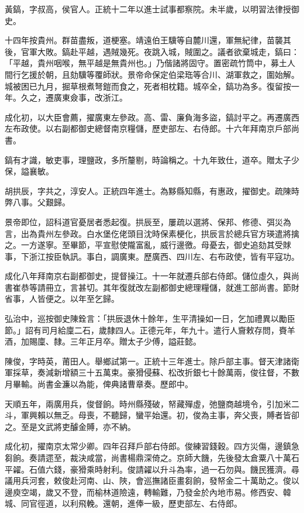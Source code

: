 \begin{pinyinscope}
黃鎬，字叔高，侯官人。正統十二年以進士試事都察院。未半歲，以明習法律授御史。

十四年按貴州。群苗盡叛，道梗塞。靖遠伯王驥等自麓川還，軍無紀律，苗襲其後，官軍大敗。鎬赴平越，遇賊幾死。夜跳入城，賊圍之。議者欲棄城走，鎬曰：「平越，貴州咽喉，無平越是無貴州也。」乃偕諸將固守。置密疏竹筒中，募土人間行乞援於朝，且劾驥等覆師狀。景帝命保定伯梁珤等合川、湖軍救之，圍始解。城被困已九月，掘草根煮弩鎧而食之，死者相枕籍。城卒全，鎬功為多。復留按一年。久之，遷廣東僉事，改浙江。

成化初，以大臣會薦，擢廣東左參政。高、雷、廉負海多盜，鎬討平之。再遷廣西左布政使。以右副都御史總督南京糧儲，歷吏部左、右侍郎。十六年拜南京戶部尚書。

鎬有才識，敏吏事，理鹽政，多所釐剔，時論稱之。十九年致仕，道卒。贈太子少保，謚襄敏。

胡拱辰，字共之，淳安人。正統四年進士。為黟縣知縣，有惠政，擢御史。疏陳時弊八事。父艱歸。

景帝即位，詔科道官憂居者悉起復。拱辰至，屢疏以選將、保邦、修德、弭災為言，出為貴州左參政。白水堡仡佬頭目沈時保素梗化，拱辰言於總兵官方瑛遣將擒之。一方遂寧。至畢節，平宣慰使隴富亂，威行邊徼。母憂去，御史追劾其受賕事，下浙江按臣執訊。事白，調廣東。歷廣西、四川左、右布政使，皆有平寇功。

成化八年拜南京右副都御史，提督操江。十一年就遷兵部右侍郎。儲位虛久，與尚書崔恭等請冊立，言甚切。其年復就改左副都御史總理糧儲，就進工部尚書。節財省事，人皆便之。以年至乞歸。

弘治中，巡按御史陳銓言：「拱辰退休十餘年，生平清操如一日，乞加禮異以勵臣節。」詔有司月給廩二石，歲隸四人。正德元年，年九十。遣行人齎敕存問，賚羊酒，加賜廩、隸。三年正月卒。贈太子少傅，謚莊懿。

陳俊，字時英，莆田人。舉鄉試第一。正統十三年進士。除戶部主事。督天津諸衛軍採草，奏減新增額三十五萬束。豪猾侵蘇、松改折銀七十餘萬兩，俊往督，不數月畢輸。尚書金濂以為能，俾典諸曹章奏。歷郎中。

天順五年，兩廣用兵，俊督餉。時州縣殘破，帑藏殫虛，弛鹽商越境令，引加米二斗，軍興賴以無乏。母喪，不聽歸，蠻平始還。初，俊為主事，奔父喪，賻者皆卻之。至是文武將吏醵金賻，亦不納。

成化初，擢南京太常少卿。四年召拜戶部右侍郎。俊練習錢穀。四方災傷，邊鎮急芻餉。奏請遝至，裁決咸當，尚書楊鼎深倚之。京師大饑，先後發太倉粟八十萬石平糴。石值六錢，豪猾乘時射利。俊請糴以升斗為率，過一石勿與。饑民獲濟。尋議用兵河套，敕俊赴河南、山、陜，會巡撫諸臣畫芻餉，發帑金二十萬助之。俊以邊庾空竭，歲又不登，而榆林道險遠，轉輸難，乃發金於內地市易。修西安、韓城、同官徑道，以利飛輓。還朝，進俸一級，歷吏部左、右侍郎。


\end{pinyinscope}
